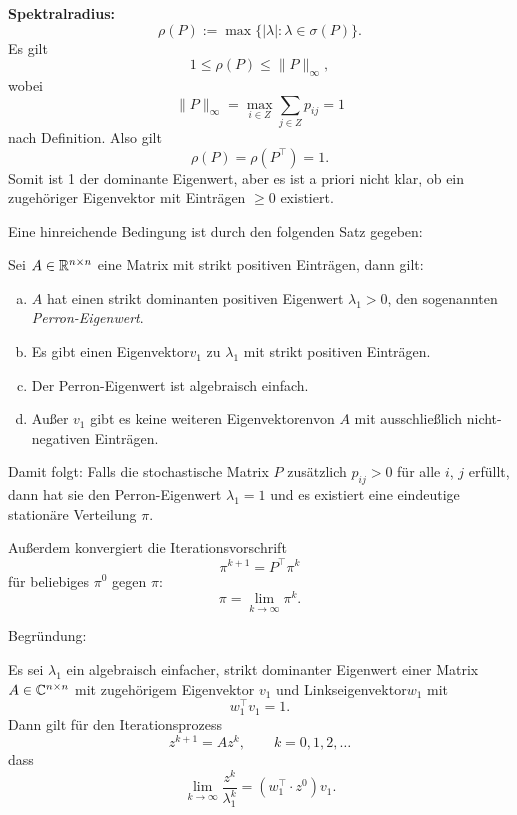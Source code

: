 \textbf{Spektralradius:}
\[ \rho( P ) := \max\{ | \lambda | : \lambda \in \sigma(P) \}. \]
Es gilt
\[ 1 \le \rho(P) \le \| P \|_{\infty}, \]
wobei
\[ \| P \|_{\infty} = \max_{i \in Z} \sum_{j \in Z} p_{ij} = 1 \]
nach Definition. Also gilt
\[ \rho( P ) = \rho( P^\top ) = 1. \]
Somit ist 1 der dominante Eigenwert, aber es ist a priori nicht klar, ob ein
zugehöriger Eigenvektor mit Einträgen $\ge 0$ existiert.

Eine hinreichende Bedingung ist durch den folgenden Satz gegeben:
\begin{thm}
  Sei $A \in \mathbb{R}^{n \times n}$ eine Matrix mit strikt positiven
  Einträgen\footnotemark, dann gilt:
  \begin{enumerate}[a)]
  \item $A$ hat einen strikt dominanten positiven Eigenwert $\lambda_1 > 0$, den
    sogenannten \emph{Perron-Eigenwert}.
  \item Es gibt einen Eigenvektor\footnotemark $v_1$ zu $\lambda_1$ 
    mit strikt positiven Einträgen.
  \item Der Perron-Eigenwert ist algebraisch einfach\footnotemark.
  \item Außer $v_1$ gibt es keine weiteren Eigenvektoren\footnotemark von $A$
    mit ausschließlich nicht-negativen Einträgen.
  \end{enumerate}
\end{thm}
\addtocounter{footnote}{-3}
\addtocounter{footnote}{1}
\addtocounter{footnote}{1}
\addtocounter{footnote}{1}

Damit folgt: Falls die stochastische Matrix $P$ zusätzlich $p_{ij} > 0$ für alle
$i$, $j$ erfüllt, dann hat sie den Perron-Eigenwert $\lambda_1 = 1$ und es
existiert eine eindeutige stationäre Verteilung $\pi$.

Außerdem konvergiert die Iterationsvorschrift
\[ \pi^{k+1} = P^\top \pi^k \]
für beliebiges $\pi^0$ gegen $\pi$:
\[ \pi  = \lim_{k \to \infty} \pi^k. \]

Begründung:
\begin{thm}
  Es sei $\lambda_1$ ein algebraisch einfacher, strikt dominanter Eigenwert
  einer Matrix $A \in \mathbb{C}^{n \times n}$ mit zugehörigem Eigenvektor $v_1$
  und Linkseigenvektor\footnotemark $w_1$ mit
  \[ w_1^\top v_1 = 1. \]
  Dann gilt für den Iterationsprozess
  \[ z^{k+1} = A z^k, \qquad k = 0, 1, 2, \ldots \]
  dass
  \[ \lim_{k \to \infty} \frac{z^k}{\lambda_1^k} = (w_1^\top \cdot z^0) v_1. \]
\end{thm}

